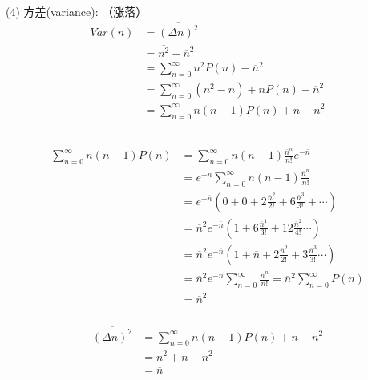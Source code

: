 \begin{frame}
 \frametitle{}
     (4) 方差(variance): （涨落）
      \[\begin{aligned}
        Var(n) &= \overline{ (\Delta n)^2 }  \\ 
        &= \overline{ n^2} - \overline{n}^2 \\
        &= \sum_{n=0} ^{\infty} n^2 P(n) -\overline{n}^2 \\ 
        &= \sum_{n=0} ^{\infty} (n^2-n) +n P(n) -\overline{n}^2 \\ 
        &= \sum_{n=0} ^{\infty} n(n-1) P(n) + \overline{n} -\overline{n}^2 \\
    \end{aligned}\]  
\end{frame}

\begin{frame}
 \frametitle{}
 \[\begin{aligned}
    \sum_{n=0} ^{\infty} n(n-1) P(n)  & =  \sum_{n=0} ^{\infty} n(n-1) \frac{\overline{n}^n}{n!} e^{-\overline{n}}  \\
    &= e^{-\overline{n}} \sum_{n=0} ^{\infty} n(n-1) \frac{\overline{n}^n}{n!} \\ 
    &= e^{-\overline{n}} (0+0+ 2 \frac{\overline{n}^2}{2!} +  6 \frac{\overline{n}^3}{3!} + \cdots  ) \\ 
    &= \overline{n}^2 e^{-\overline{n}} (1 +  6 \frac{\overline{n}^1}{3!} + 12 \frac{\overline{n}^2}{4!}  \cdots  ) \\ 
    &= \overline{n}^2 e^{-\overline{n}} (1+ \overline{n} +  2 \frac{\overline{n}^2}{2!} + 3 \frac{\overline{n}^3}{3!}  \cdots  ) \\ 
    &= \overline{n}^2 e^{-\overline{n}} \sum_{n=0} ^{\infty} \frac{\overline{n}^n}{n!} = \overline{n}^2 \sum_{n=0} ^{\infty}  P(n)\\ 
    & = \overline{n}^2
\end{aligned}\]  
\end{frame}

\begin{frame}
    \frametitle{}
         \[\begin{aligned}
            \overline{ (\Delta n)^2 }  &= \sum_{n=0} ^{\infty} n(n-1) P(n) + \overline{n} -\overline{n}^2 \\
           &= \overline{n}^2  + \overline{n} -\overline{n}^2 \\ 
           &= \overline{n}
       \end{aligned}\]  
   \end{frame}

